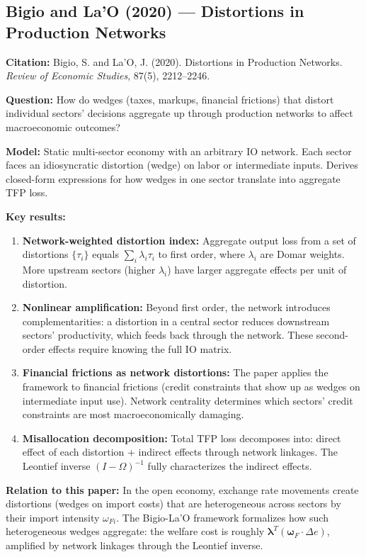 \documentclass[12pt]{article}
\begin{document}
\subsection{Bigio and La'O (2020) --- Distortions in Production Networks}

\textbf{Citation:} Bigio, S. and La'O, J. (2020). Distortions in Production Networks. \textit{Review of Economic Studies}, 87(5), 2212--2246.

\textbf{Question:} How do wedges (taxes, markups, financial frictions) that distort individual sectors' decisions aggregate up through production networks to affect macroeconomic outcomes?

\textbf{Model:} Static multi-sector economy with an arbitrary IO network. Each sector faces an idiosyncratic distortion (wedge) on labor or intermediate inputs. Derives closed-form expressions for how wedges in one sector translate into aggregate TFP loss.

\textbf{Key results:}
\begin{enumerate}
    \item \textbf{Network-weighted distortion index:} Aggregate output loss from a set of distortions $\{\tau_i\}$ equals $\sum_i \lambda_i \tau_i$ to first order, where $\lambda_i$ are Domar weights. More upstream sectors (higher $\lambda_i$) have larger aggregate effects per unit of distortion.
    \item \textbf{Nonlinear amplification:} Beyond first order, the network introduces complementarities: a distortion in a central sector reduces downstream sectors' productivity, which feeds back through the network. These second-order effects require knowing the full IO matrix.
    \item \textbf{Financial frictions as network distortions:} The paper applies the framework to financial frictions (credit constraints that show up as wedges on intermediate input use). Network centrality determines which sectors' credit constraints are most macroeconomically damaging.
    \item \textbf{Misallocation decomposition:} Total TFP loss decomposes into: direct effect of each distortion + indirect effects through network linkages. The Leontief inverse $(I-\Omega)^{-1}$ fully characterizes the indirect effects.
\end{enumerate}

\textbf{Relation to this paper:} In the open economy, exchange rate movements create distortions (wedges on import costs) that are heterogeneous across sectors by their import intensity $\omega_{Fi}$. The Bigio-La'O framework formalizes how such heterogeneous wedges aggregate: the welfare cost is roughly $\bm{\lambda}^T(\bm{\omega}_F \cdot \Delta e)$, amplified by network linkages through the Leontief inverse.
\end{document}
